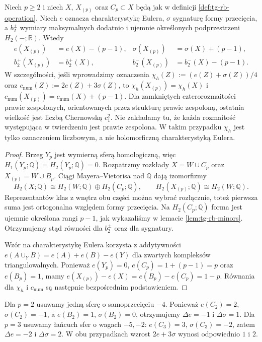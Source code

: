 \begin{twierdzenie}
\label{thm:tg-rb-invariants}
Niech $p\geq2$ i niech $X$, $X_{(p)}$ oraz
$C_p\subset X$ będą jak w definicji
\ref{def:tg-rb-operation}.
Niech $e$ oznacza charakterystykę Eulera,
$\sigma$ sygnaturę formy przecięcia, a
$b_2^\pm$ wymiary maksymalnych dodatnio i
ujemnie określonych podprzestrzeni
$H_2(-;\mathbb R)$.
Wtedy
\[
\begin{aligned}
e(X_{(p)})&=e(X)-(p-1), &
\sigma(X_{(p)})&=\sigma(X)+(p-1),\\
b_2^+(X_{(p)})&=b_2^+(X), &
b_2^-(X_{(p)})&=b_2^-(X)-(p-1).
\end{aligned}
\]
W szczególności, jeśli wprowadzimy oznaczenia
$\chi_h(Z):=(e(Z)+\sigma(Z))/4$ oraz
$c_{\mathrm{num}}(Z):=2e(Z)+3\sigma(Z)$,
to $\chi_h(X_{(p)})=\chi_h(X)$ i
$c_{\mathrm{num}}(X_{(p)})=c_{\mathrm{num}}(X)+(p-1)$.
Dla zamkniętych czterorozmaitości prawie zespolonych,
orientowanych przez strukturę prawie zespoloną,
ostatnia wielkość jest liczbą Chernowską $c_1^2$.
Nie zakładamy tu, że każda rozmaitość występująca
w twierdzeniu jest prawie zespolona. W takim przypadku
$\chi_h$ jest tylko oznaczeniem liczbowym, a nie holomorficzną
charakterystyką Eulera.
\end{twierdzenie}

\begin{proof}
Brzeg $Y_p$ jest wymierną sferą homologiczną,
więc $H_1(Y_p;\mathbb Q)=H_2(Y_p;\mathbb Q)=0$.
Rozpatrzmy rozkłady $X=W\cup C_p$ oraz
$X_{(p)}=W\cup B_p$. Ciągi Mayera--Vietorisa
nad $\mathbb Q$ dają izomorfizmy
\[
H_2(X;\mathbb Q)\cong H_2(W;\mathbb Q)
\oplus H_2(C_p;\mathbb Q),\qquad
H_2(X_{(p)};\mathbb Q)\cong H_2(W;\mathbb Q).
\]
Reprezentantów klas z wnętrz obu części można
wybrać rozłącznie, toteż pierwsza suma jest
ortogonalna względem formy przecięcia.
Na $H_2(C_p;\mathbb Q)$ forma jest ujemnie określona
rangi $p-1$, jak wykazaliśmy w lemacie
\ref{lem:tg-rb-minors}. Otrzymujemy stąd równości
dla $b_2^\pm$ oraz dla sygnatury.

Wzór na charakterystykę Eulera korzysta z addytywności
$e(A\cup_YB)=e(A)+e(B)-e(Y)$ dla zwartych
kompleksów triangulowalnych. Ponieważ
$e(Y_p)=0$, $e(C_p)=1+(p-1)=p$ oraz
$e(B_p)=1$, mamy
$e(X_{(p)})-e(X)=e(B_p)-e(C_p)=1-p$.
Równania dla $\chi_h$ i $c_{\mathrm{num}}$ są
następnie bezpośrednim podstawieniem.
\end{proof}

\begin{przyklad}[Kontrola dla $p=2$ i $p=3$]
Dla $p=2$ usuwamy jedną sferę o samoprzecięciu
$-4$. Ponieważ $e(C_2)=2$, $\sigma(C_2)=-1$,
a $e(B_2)=1$, $\sigma(B_2)=0$, otrzymujemy
$\Delta e=-1$ i $\Delta\sigma=1$.
Dla $p=3$ usuwamy łańcuch sfer o wagach $-5,-2$:
$e(C_3)=3$, $\sigma(C_3)=-2$, zatem
$\Delta e=-2$ i $\Delta\sigma=2$.
W obu przypadkach wzrost $2e+3\sigma$ wynosi
odpowiednio $1$ i $2$.
\end{przyklad}


